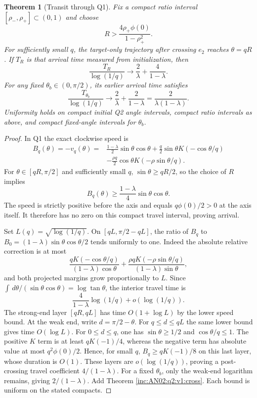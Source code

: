 \documentclass[11pt]{article}
\numberwithin{equation}{section}
\newtheorem{theorem}{Theorem}[section]\newtheorem{lemma}[theorem]{Lemma}
\theoremstyle{remark}\newtheorem{remark}[theorem]{Remark}
\newcommand{\dd}{\,d}\newcommand{\E}{\mathbb E}\newcommand{\R}{\mathbb R}
\begin{document}
\begin{theorem}[Transit through Q1]
\label{inc:AN02:q2:v1:transit}
Fix a compact ratio interval $[\rho_-,\rho_+]\subset(0,1)$ and
choose
\[
 R>\frac{4\rho_+\phi(0)}{1-\rho_+^2}.
\]
For sufficiently small $q$, the target-only trajectory after crossing
$e_2$ reaches $\theta=qR$. If $T_R$ is that arrival time measured
from initialization, then
\begin{equation}\label{inc:AN02:q2:v1:strongtime}
 \frac{T_R}{\log(1/q)}\longrightarrow
          \frac2\lambda+\frac4{1-\lambda}.
\end{equation}
For any fixed $\theta_b\in(0,\pi/2)$, its earlier arrival time satisfies
\begin{equation}\label{inc:AN02:q2:v1:fixedtime}
 \frac{T_{\theta_b}}{\log(1/q)}\longrightarrow
          \frac2\lambda+\frac2{1-\lambda}
          =\frac{2}{\lambda(1-\lambda)}.
\end{equation}
Uniformity holds on compact initial Q2 angle intervals, compact ratio
intervals as above, and compact fixed-angle intervals for $\theta_b$.
\end{theorem}
\begin{proof}
In Q1 the exact clockwise speed is
\begin{align*}
 B_q(\theta)=-v_q(\theta)
 ={}&\frac{1-\lambda}{2}\sin\theta\cos\theta
 +\frac q2\sin\theta K(-\cos\theta/q)\\
 &-\frac{\rho q}{2}\cos\theta K(-\rho\sin\theta/q).
\end{align*}
For $\theta\in[qR,\pi/2]$ and sufficiently small $q$,
$\sin\theta\ge qR/2$, so the choice of $R$ implies
\[
 B_q(\theta)\ge\frac{1-\lambda}{4}\sin\theta\cos\theta.
\]
The speed is strictly positive before the axis and equals
$q\phi(0)/2>0$ at the axis itself. It therefore has no zero on
this compact travel interval, proving arrival.

Set $L(q)=\sqrt{\log(1/q)}$. On
$[qL,\pi/2-qL]$, the ratio of $B_q$ to
$B_0=(1-\lambda)\sin\theta\cos\theta/2$ tends uniformly to one.
Indeed the absolute relative correction is at most
\[
 \frac{qK(-\cos\theta/q)}{(1-\lambda)\cos\theta}
 +\frac{\rho qK(-\rho\sin\theta/q)}{(1-\lambda)\sin\theta},
\]
and both projected margins grow proportionally to $L$.
Since $\int\dd\theta/(\sin\theta\cos\theta)=\log\tan\theta$,
the interior travel time is
\[
 \frac4{1-\lambda}\log(1/q)+o(\log(1/q)).
\]
The strong-end layer $[qR,qL]$ has time $O(1+\log L)$ by the
lower speed bound. At the weak end, write $d=\pi/2-\theta$.
For $q\le d\le qL$ the same lower bound gives time $O(\log L)$.
For $0\le d\le q$, one has $\sin\theta\ge1/2$ and
$\cos\theta/q\le1$. The positive $K$ term is at least
$qK(-1)/4$, whereas the negative term has absolute value at most
$q^2\phi(0)/2$. Hence, for small $q$, $B_q\ge qK(-1)/8$ on
this last layer, whose duration is $O(1)$.
These layers are $o(\log(1/q))$, proving a post-crossing travel
coefficient $4/(1-\lambda)$. For a fixed $\theta_b$, only the
weak-end logarithm remains, giving $2/(1-\lambda)$. Add Theorem
\ref{inc:AN02:q2:v1:cross}. Each bound is uniform on the stated compacts.
\end{proof}
\end{document}
